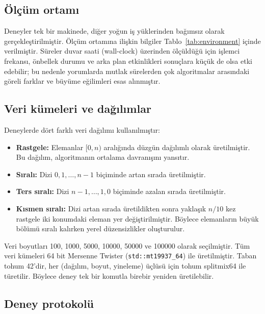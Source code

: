 \documentclass[12pt,a4paper]{article}
\begin{document}
\subsection{Ölçüm ortamı}

Deneyler tek bir makinede, diğer yoğun iş yüklerinden bağımsız olarak
gerçekleştirilmiştir. Ölçüm ortamına ilişkin bilgiler Tablo~\ref{tab:environment}
içinde verilmiştir. Süreler duvar saati (wall-clock) üzerinden ölçüldüğü için
işlemci frekansı, önbellek durumu ve arka plan etkinlikleri sonuçlara küçük de
olsa etki edebilir; bu nedenle yorumlarda mutlak sürelerden çok algoritmalar
arasındaki göreli farklar ve büyüme eğilimleri esas alınmıştır.



\subsection{Veri kümeleri ve dağılımlar}

Deneylerde dört farklı veri dağılımı kullanılmıştır:

\begin{itemize}
  \item \textbf{Rastgele:} Elemanlar $[0, n)$ aralığında düzgün dağılımlı
        olarak üretilmiştir. Bu dağılım, algoritmanın ortalama davranışını
        yansıtır.
  \item \textbf{Sıralı:} Dizi $0, 1, \dots, n-1$ biçiminde artan sırada
        üretilmiştir.
  \item \textbf{Ters sıralı:} Dizi $n-1, \dots, 1, 0$ biçiminde azalan sırada
        üretilmiştir.
  \item \textbf{Kısmen sıralı:} Dizi artan sırada üretildikten sonra yaklaşık
        $n/10$ kez rastgele iki konumdaki eleman yer değiştirilmiştir. Böylece
        elemanların büyük bölümü sıralı kalırken yerel düzensizlikler
        oluşturulur.
\end{itemize}

Veri boyutları 100, 1000, 5000, 10000, 50000 ve 100000 olarak seçilmiştir.
Tüm veri kümeleri 64 bit Mersenne Twister (\texttt{std::mt19937\_64}) ile üretilmiştir.
Taban tohum 42'dir, her (dağılım, boyut, yineleme) üçlüsü için tohum splitmix64 ile türetilir.
Böylece deney tek bir komutla birebir yeniden üretilebilir.

\subsection{Deney protokolü}
\end{document}
